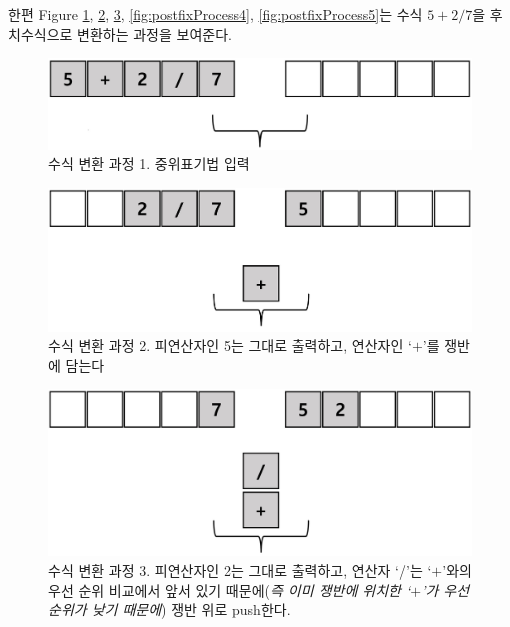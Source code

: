 \documentclass{article}
\begin{document}
한편 Figure \ref{fig:postfixProcess1}, \ref{fig:postfixProcess2}, \ref{fig:postfixProcess3}, \ref{fig:postfixProcess4}, \ref{fig:postfixProcess5}는 수식 $5 + 2 / 7$을 후치수식으로 변환하는 과정을 보여준다.
\begin{figure} [ht!]
    \centering
    \includegraphics[width=\textwidth]{postfix_process_1.jpg}
    \caption[수식 변환 과정 1]{수식 변환 과정 1. 중위표기법 입력}
    \label{fig:postfixProcess1}
\end{figure}
\begin{figure}[ht!]
    \centering
    \includegraphics[width=\textwidth]{postfix_process_2.jpg}
    \caption[수식 변환 과정 2]{수식 변환 과정 2. 피연산자인 5는 그대로 출력하고, 연산자인 `$+$'를 쟁반에 담는다}
    \label{fig:postfixProcess2}
\end{figure}
\begin{figure}[ht!]
    \centering
    \includegraphics[width=\textwidth]{postfix_process_3.jpg}
    \caption[수식 변환 과정 3]{수식 변환 과정 3. 피연산자인 2는 그대로 출력하고, 연산자 `/'는 `$+$'와의 우선 순위 비교에서 앞서 있기 때문에(\textit{즉 이미 쟁반에 위치한 `$+$'가 우선 순위가 낮기 때문에}) 쟁반 위로 push한다.}
    \label{fig:postfixProcess3}
\end{figure}
\end{document}
